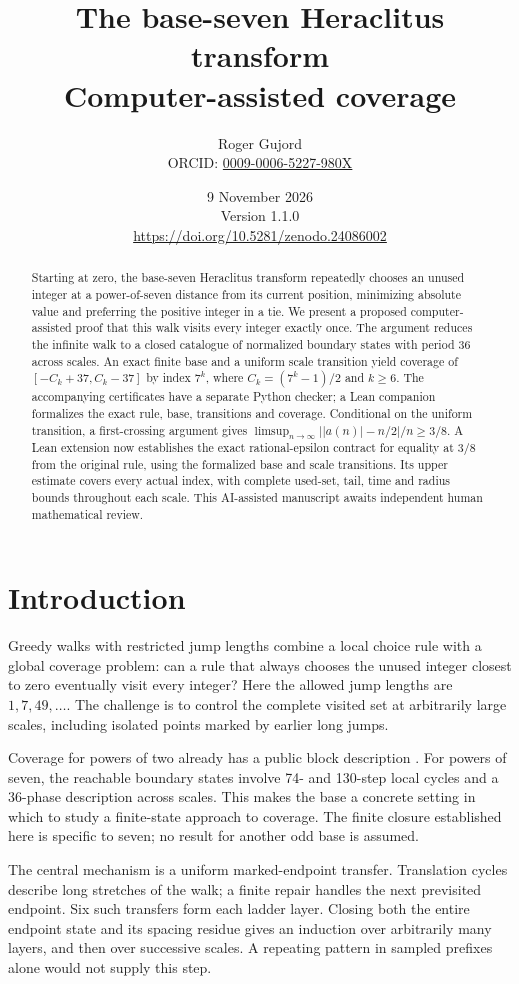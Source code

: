 \documentclass[11pt,a4paper]{article}
\title{The base-seven Heraclitus transform\\[5pt]\large Computer-assisted coverage}
\author{Roger Gujord\\\small ORCID: \href{https://orcid.org/0009-0006-5227-980X}{0009-0006-5227-980X}}
\date{9 November 2026\\\small Version 1.1.0\\\small\url{https://doi.org/10.5281/zenodo.24086002}}
\begin{document}
\maketitle
\begin{abstract}
Starting at zero, the base-seven Heraclitus transform repeatedly chooses an
unused integer at a power-of-seven distance from its current position,
minimizing absolute value and preferring the positive integer in a tie.
We present a proposed computer-assisted proof that this walk visits every
integer exactly once. The argument reduces the infinite walk to a closed
catalogue of normalized boundary states with period 36 across scales.
An exact finite base and a uniform scale transition yield coverage of
$[-C_k+37,C_k-37]$ by index $7^k$, where $C_k=(7^k-1)/2$ and $k\ge6$.
The accompanying certificates have a separate Python checker; a Lean
companion formalizes the exact rule, base, transitions and coverage.
Conditional on the uniform transition, a first-crossing argument gives
$\limsup_{n\to\infty}\bigl||a(n)|-n/2\bigr|/n\ge3/8$.
A Lean extension now establishes the exact rational-epsilon contract for
equality at $3/8$ from the original rule, using the formalized base and
scale transitions. Its upper estimate covers every actual index, with
complete used-set, tail, time and radius bounds throughout each scale.
This AI-assisted manuscript awaits independent human mathematical review.
\end{abstract}

\section*{Introduction}
Greedy walks with restricted jump lengths combine a local choice rule with
a global coverage problem: can a rule that always chooses the unused
integer closest to zero eventually visit every integer? Here the allowed
jump lengths are $1,7,49,\ldots$. The challenge is to control the complete
visited set at arbitrarily large scales, including isolated points marked
by earlier long jumps.

Coverage for powers of two already has a public block description \cite{ref1}.
For powers of seven, the reachable boundary states involve 74- and 130-step
local cycles and a 36-phase description across scales. This makes the base
a concrete setting in which to study a finite-state approach to coverage.
The finite closure established here is specific to seven; no result for
another odd base is assumed.

The central mechanism is a uniform marked-endpoint transfer. Translation
cycles describe long stretches of the walk; a finite repair handles the
next previsited endpoint. Six such transfers form each ladder layer.
Closing both the entire endpoint state and its spacing residue gives an
induction over arbitrarily many layers, and then over successive scales.
A repeating pattern in sampled prefixes alone would not supply this step.
\end{document}
